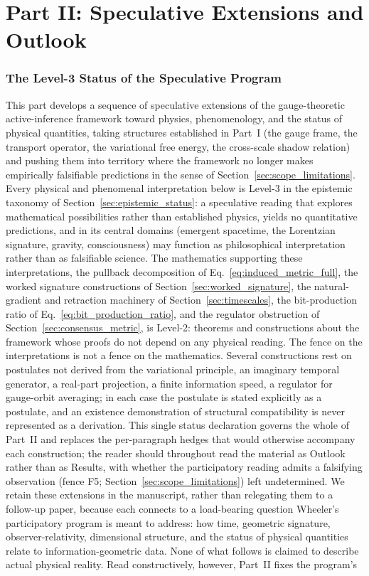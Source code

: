 \documentclass[11pt]{article}
\begin{document}
\part*{Part II: Speculative Extensions and Outlook}

\section{The Level-3 Status of the Speculative Program}\label{sec:part2_preamble}

This part develops a sequence of speculative extensions of the gauge-theoretic active-inference framework toward physics, phenomenology, and the status of physical quantities, taking structures established in Part~I (the gauge frame, the transport operator, the variational free energy, the cross-scale shadow relation) and pushing them into territory where the framework no longer makes empirically falsifiable predictions in the sense of Section~\ref{sec:scope_limitations}. Every physical and phenomenal interpretation below is Level-3 in the epistemic taxonomy of Section~\ref{sec:epistemic_status}: a speculative reading that explores mathematical possibilities rather than established physics, yields no quantitative predictions, and in its central domains (emergent spacetime, the Lorentzian signature, gravity, consciousness) may function as philosophical interpretation rather than as falsifiable science. The mathematics supporting these interpretations, the pullback decomposition of Eq.~\eqref{eq:induced_metric_full}, the worked signature constructions of Section~\ref{sec:worked_signature}, the natural-gradient and retraction machinery of Section~\ref{sec:timescales}, the bit-production ratio of Eq.~\eqref{eq:bit_production_ratio}, and the regulator obstruction of Section~\ref{sec:consensus_metric}, is Level-2: theorems and constructions about the framework whose proofs do not depend on any physical reading. The fence on the interpretations is not a fence on the mathematics. Several constructions rest on postulates not derived from the variational principle, an imaginary temporal generator, a real-part projection, a finite information speed, a regulator for gauge-orbit averaging; in each case the postulate is stated explicitly as a postulate, and an existence demonstration of structural compatibility is never represented as a derivation. This single status declaration governs the whole of Part~II and replaces the per-paragraph hedges that would otherwise accompany each construction; the reader should throughout read the material as Outlook rather than as Results, with whether the participatory reading admits a falsifying observation (fence F5; Section~\ref{sec:scope_limitations}) left undetermined. We retain these extensions in the manuscript, rather than relegating them to a follow-up paper, because each connects to a load-bearing question Wheeler's participatory program is meant to address: how time, geometric signature, observer-relativity, dimensional structure, and the status of physical quantities relate to information-geometric data. None of what follows is claimed to describe actual physical reality. Read constructively, however, Part~II fixes the program's 
\end{document}
